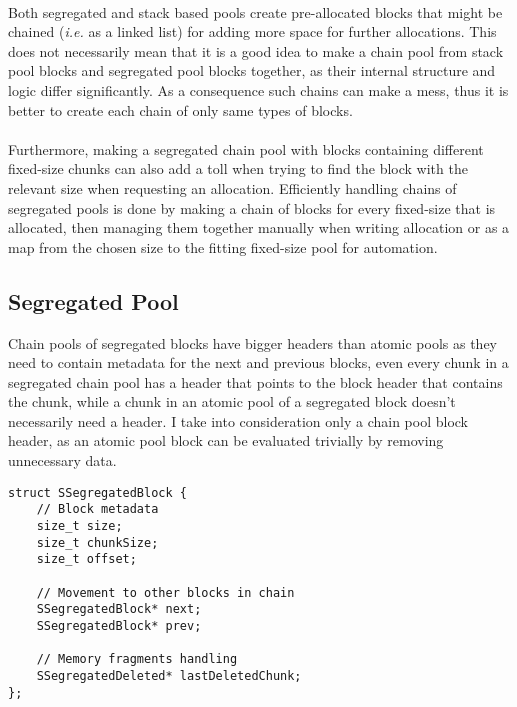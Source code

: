 \documentclass[a4paper, 12pt]{article}
\begin{document}
\paragraph{}
Both segregated and stack based pools create pre-allocated blocks that might be chained (\textit{i.e.} as a linked list) for adding more space for further allocations.
This does not necessarily mean that it is a good idea to make a chain pool from stack pool blocks and segregated pool blocks together, as their internal structure and logic differ significantly.
As a consequence such chains can make a mess, thus it is better to create each chain of only same types of blocks.

\paragraph{}
Furthermore, making a segregated chain pool with blocks containing different fixed-size chunks can also add a toll when trying to find the block with the relevant size when requesting an allocation.
Efficiently handling chains of segregated pools is done by making a chain of blocks for every fixed-size that is allocated, then managing them together manually when writing allocation or as a map from the chosen size to the fitting fixed-size pool for automation.

\subsection{Segregated Pool}
Chain pools of segregated blocks have bigger headers than atomic pools as they need to contain metadata for the next and previous blocks, even every chunk in a segregated chain pool has a header that points to the block header that contains the chunk, while a chunk in an atomic pool of a segregated block doesn't necessarily need a header.
I take into consideration only a chain pool block header, as an atomic pool block can be evaluated trivially by removing unnecessary data.
\begin{verbatim}
struct SSegregatedBlock {
    // Block metadata
    size_t size;
    size_t chunkSize;
    size_t offset;

    // Movement to other blocks in chain
    SSegregatedBlock* next;
    SSegregatedBlock* prev;

    // Memory fragments handling
    SSegregatedDeleted* lastDeletedChunk;
};
\end{verbatim}
\end{document}
